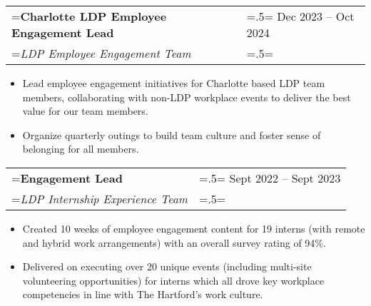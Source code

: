 \documentclass{article}
\begin{document}
\hspace{-1em}
\begin{tabularx}{\textwidth}{
    >{\raggedright\arraybackslash\hsize=1.5\hsize\linewidth=\hsize}X
    >{\raggedleft\arraybackslash\hsize=.5\hsize\linewidth=\hsize}X }
    \textbf{Charlotte LDP Employee Engagement Lead} & Dec 2023 -- Oct 2024\\
    \textit{LDP Employee Engagement Team} & \\
\end{tabularx}
\vspace{-.5em}
\begin{itemize}[label={--}, leftmargin=1em]
    \setlength\itemsep{0em}
    \item Lead employee engagement initiatives for Charlotte based LDP team members, collaborating with non-LDP workplace events to deliver the best value for our team members.
    \item Organize quarterly outings to build team culture and foster sense of belonging for all members.
\end{itemize}

\hspace{-1em}
\begin{tabularx}{\textwidth}{
    >{\raggedright\arraybackslash\hsize=1.5\hsize\linewidth=\hsize}X
    >{\raggedleft\arraybackslash\hsize=.5\hsize\linewidth=\hsize}X }
    \textbf{Engagement Lead} & Sept 2022 -- Sept 2023\\
    \textit{LDP Internship Experience Team} & \\
\end{tabularx}
\vspace{-.5em}
\begin{itemize}[label={--}, leftmargin=1em]
    \setlength\itemsep{0em}
    \item Created 10 weeks of employee engagement content for 19 interns (with remote and hybrid work arrangements) with an overall survey rating of 94\%.
    \item Delivered on executing over 20 unique events (including multi-site volunteering opportunities) for interns which all drove key workplace competencies in line with The Hartford's work culture.
\end{itemize}
\end{document}
